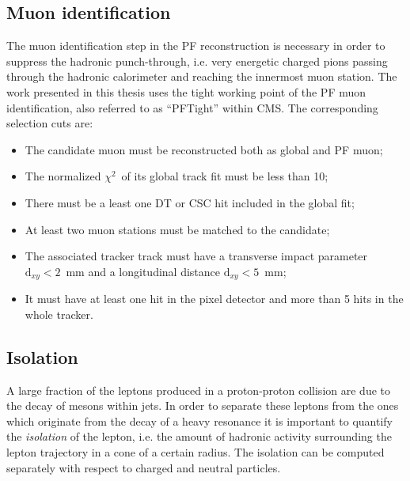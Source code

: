 \subsection{Muon identification}

The muon identification step in the PF reconstruction is necessary in order to suppress the hadronic punch-through, i.e. very energetic charged pions passing through the hadronic calorimeter and reaching the innermost muon station. %
The work presented in this thesis uses the tight working point of the PF muon identification, also referred to as ``PFTight'' within CMS.
The corresponding selection cuts are:

\begin{itemize}
\item The candidate muon must be reconstructed both as global and PF muon;
\item The normalized $\chi^2$\ of its global track fit must be less than 10;
\item There must be a least one DT or CSC hit included in the global fit;
\item At least two muon stations must be matched to the candidate;
\item The associated tracker track must have a transverse impact parameter $\mathrm{d}_{xy} < 2$\ mm and a longitudinal distance $\mathrm{d}_{xy} < 5$\ mm;
\item It must have at least one hit in the pixel detector and more than 5 hits in the whole tracker.
\end{itemize}

\subsection{Isolation}

A large fraction of the leptons produced in a proton-proton collision are due to the decay of mesons within jets. In order to separate these leptons from the ones which originate from the decay of a heavy resonance it is important to quantify the \emph{isolation} of the lepton, i.e. the amount of hadronic activity surrounding the lepton trajectory in a cone of a certain radius. The isolation can be computed separately with respect to charged and neutral particles. 

